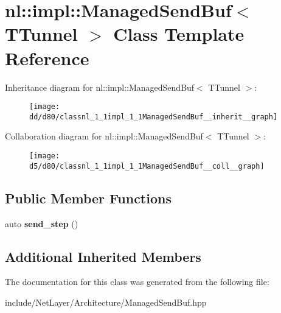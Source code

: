 \hypertarget{classnl_1_1impl_1_1ManagedSendBuf}{}\section{nl\+:\+:impl\+:\+:Managed\+Send\+Buf$<$ T\+Tunnel $>$ Class Template Reference}
\label{classnl_1_1impl_1_1ManagedSendBuf}


Inheritance diagram for nl\+:\+:impl\+:\+:Managed\+Send\+Buf$<$ T\+Tunnel $>$\+:\nopagebreak
\begin{figure}[H]
\begin{center}
\leavevmode
\texttt{[image: dd/d80/classnl\_1\_1impl\_1\_1ManagedSendBuf\_\_inherit\_\_graph]}
\end{center}
\end{figure}


Collaboration diagram for nl\+:\+:impl\+:\+:Managed\+Send\+Buf$<$ T\+Tunnel $>$\+:\nopagebreak
\begin{figure}[H]
\begin{center}
\leavevmode
\texttt{[image: d5/d80/classnl\_1\_1impl\_1\_1ManagedSendBuf\_\_coll\_\_graph]}
\end{center}
\end{figure}
\subsection*{Public Member Functions}
\begin{DoxyCompactItemize}
\item 
\hypertarget{classnl_1_1impl_1_1ManagedSendBuf_a07d7f60b6c6ac190283ad3e1c7fed896}{}auto {\bfseries send\+\_\+step} ()\label{classnl_1_1impl_1_1ManagedSendBuf_a07d7f60b6c6ac190283ad3e1c7fed896}

\end{DoxyCompactItemize}
\subsection*{Additional Inherited Members}


The documentation for this class was generated from the following file\+:\begin{DoxyCompactItemize}
\item 
include/\+Net\+Layer/\+Architecture/Managed\+Send\+Buf.\+hpp\end{DoxyCompactItemize}
